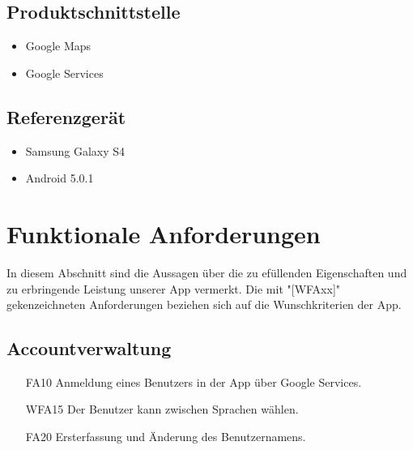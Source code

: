 \documentclass{scrartcl}
\begin{document}
	\subsection{Produktschnittstelle}
	\begin{itemize}	        
		\item Google Maps
		\item Google Services
	\end{itemize}
	\subsection{Referenzgerät}
	\begin{itemize}
		\item Samsung Galaxy S4
		\item \gls{Android} 5.0.1
	\end{itemize}
	\newpage
	
	
	\section{Funktionale Anforderungen}
	 In diesem Abschnitt sind die Aussagen über die zu efüllenden Eigenschaften und zu erbringende Leistung unserer App vermerkt. Die mit "[WFAxx]" gekenzeichneten Anforderungen beziehen sich auf die Wunschkriterien der App.
	 
	\subsection{Accountverwaltung}
	\begin{itemize}
		\item[FA10] Anmeldung eines Benutzers in der App über Google Services.
		\item[WFA15] Der Benutzer kann zwischen Sprachen wählen.
		\item[FA20] Ersterfassung und Änderung des Benutzernamens.
		
	\end{itemize}
	
\end{document}

